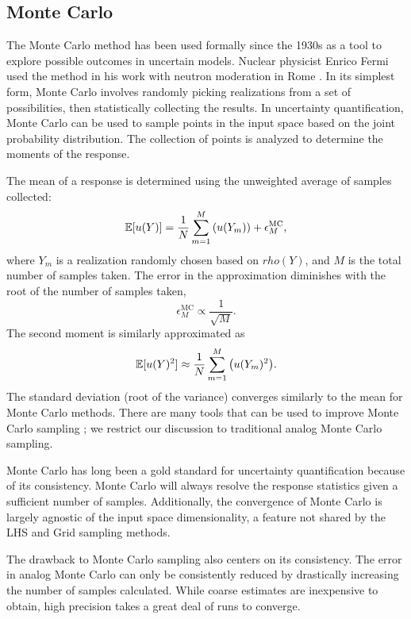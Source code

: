 \subsection{Monte Carlo}
The Monte Carlo method \cite{mc} has been used formally since the 1930s as a tool to explore possible outcomes
in uncertain models.  Nuclear physicist Enrico Fermi used the method in his work with neutron moderation in
Rome \cite{mcfermi}.  In its simplest form, Monte Carlo involves randomly picking realizations from a set of
possibilities, then statistically collecting the results.  In uncertainty quantification, Monte Carlo can be
used to sample points in the input space based on the joint probability distribution.  The collection of
points is analyzed to determine the moments of the response.

The mean of a response is determined using the unweighted average of samples collected:
\begin{equation}
  \mathbb{E}[ u(Y)] = \frac{1}{N}\sum_{m=1}^M \qty(u(Y_m)) + \epsilon_M^{\text{MC}},
\end{equation}
where $Y_m$ is a realization randomly chosen based on $rho(Y)$, and $M$ is the total number of samples taken.
The error in the approximation diminishes with the root of the number of samples taken,
\begin{equation}
  \epsilon_M^{\text{MC}} \propto \frac{1}{\sqrt{M}}.
\end{equation}
The second moment is similarly approximated as
\begin{equation}
  \mathbb{E}[ u(Y)^2] \approx \frac{1}{N}\sum_{m=1}^M \qty(u(Y_m)^2).
\end{equation}
The standard deviation (root of the variance) converges similarly to the mean for Monte Carlo methods.  There
are many tools that can be used to improve Monte Carlo sampling \cite{mcvarred}\cite{mcnpvarred}; we restrict
our discussion to traditional analog Monte Carlo sampling.

Monte Carlo has long been a gold standard for uncertainty quantification because of its consistency.  Monte
Carlo will always resolve the response statistics given a sufficient number of samples.  Additionally, the
convergence of Monte Carlo is largely agnostic of the input space dimensionality, a feature not shared by the
LHS and Grid sampling methods.

The drawback to Monte Carlo sampling also centers on its consistency.  The error in analog Monte Carlo can only be
consistently reduced by drastically increasing the number of samples calculated.  While coarse estimates are
inexpensive to obtain, high precision takes a great deal of runs to converge.

